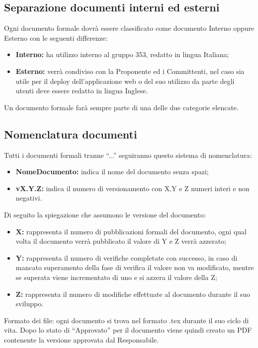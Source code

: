 \documentclass[NormeDiProgetto.tex]{subfiles}
\begin{document}
	\subsection{Separazione documenti interni ed esterni}
	Ogni documento formale dovrà essere classificato come documento Interno
	oppure Esterno con le seguenti differenze:
	\begin{itemize}
		\item \textbf{Interno:} ha utilizzo interno al gruppo 353, redatto in lingua Italiana;
		\item \textbf{Esterno:} verrà condiviso con la Proponente ed i Committenti, nel caso sia utile per il deploy dell'applicazione web o del suo utilizzo da parte degli utenti deve essere redatto in lingua Inglese.
	\end{itemize}
	Un documento formale farà sempre parte di una delle due categorie elencate.
	
	\subsection{Nomenclatura documenti}
	Tutti i documenti formali tranne “...” seguiranno questo sistema di nomenclatura: %

	\begin{itemize}
		\item\textbf{ NomeDocumento:} indica il nome del documento senza spazi;
		\item \textbf{vX.Y.Z:} indica il numero di versionamento con X,Y e Z numeri interi e non negativi.	
	\end{itemize}
	Di seguito la spiegazione che assumono le versione del documento:
	\begin{itemize}
		\item \textbf{X:} rappresenta il numero di pubblicazioni formali del documento, ogni qual volta il documento verrà pubblicato il valore di Y e Z verrà azzerato;
		\item \textbf{Y:} rappresenta il numero di verifiche completate con successo, in caso di mancato superamento della fase di verifica il valore non va modificato, mentre se superata viene incrementato di uno e si azzera il valore della Z;
		\item \textbf{Z:} rappresenta il numero di modifiche effettuate al documento durante il suo sviluppo.	
	\end{itemize}
	Formato dei file: ogni documento si trova nel formato .tex durante il suo ciclo di vita.
	Dopo lo stato di “Approvato” per il documento viene quindi creato un PDF contenente la versione approvata dal Responsabile.
	
\end{document}
